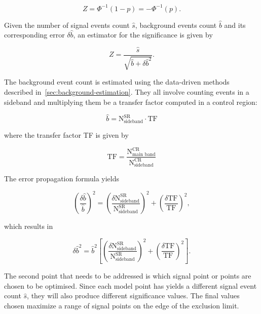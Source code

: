 \begin{equation}
Z = \Phi^{-1}(1-p)=-\Phi^{-1}(p).
\end{equation}

Given the number of signal events count $\hat{s}$, background events count $\hat{b}$ and its corresponding error $\delta \hat{b}$, an estimator for the significance is given by

\begin{equation}
Z = \frac{\hat{s}}{\sqrt{\hat{b}+\delta \hat{b}^2}}.
\end{equation}

The background event count is estimated using the data-driven methods described in~\ref{sec:background-estimation}. They all involve counting events in a sideband and multiplying them be a transfer factor computed in a control region:

\begin{equation}
\hat{b} = \mathrm{N}^{\mathrm{SR}}_{\text{sideband}}\cdot \mathrm{TF}
\end{equation}

where the transfer factor TF is given by 

\begin{equation}
\mathrm{TF}=\frac{\mathrm{N}^{\mathrm{CR}}_{\text{main band}}}{\mathrm{N}^{\mathrm{CR}}_{\text{sideband}}}
\end{equation}

The error propagation formula yields

\begin{equation}
\left( \frac{\delta \hat{b}}{\hat{b}}  \right)^2=\left( \frac{\delta \mathrm{N}^{\mathrm{SR}}_{\text{sideband}}}{\mathrm{N}^{\mathrm{SR}}_{\text{sideband}}}  \right)^2 + \left( \frac{\delta \mathrm{TF}}{\mathrm{TF}}  \right)^2,
\end{equation}

which results in

\begin{equation}
\delta \hat{b}^2=\hat{b}^2 \left[ \left( \frac{\delta \mathrm{N}^{\mathrm{SR}}_{\text{sideband}}}{\mathrm{N}^{\mathrm{SR}}_{\text{sideband}}}  \right)^2 + \left( \frac{\delta \mathrm{TF}}{\mathrm{TF}}  \right)^2 \right] .
\end{equation}

The second point that needs to be addressed is which signal point or points are chosen to be optimised. Since each model point has yields a different signal event count $\hat{s}$, they will also produce different significance values. The final values chosen maximize a range of signal points on the edge of the exclusion limit. 

